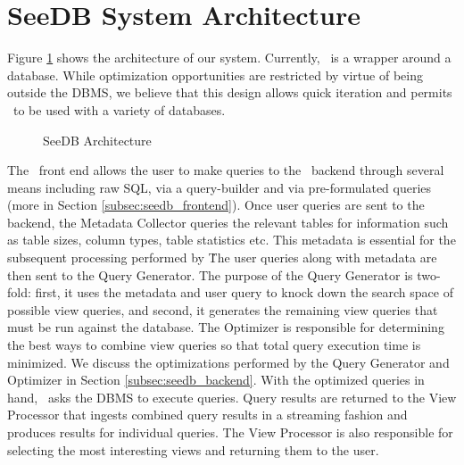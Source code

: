 \section{SeeDB System Architecture}
\label{sec:architecture}

Figure \ref{fig:sys-arch} shows the architecture of our system. Currently,
\SeeDB\ is a wrapper around a database. While optimization opportunities are
restricted by virtue of being outside the DBMS, we believe that this design
allows quick iteration and permits \SeeDB\ to be used with a variety of
databases.

\begin{figure}[htb]
\centerline{
\hbox{}}
\caption{SeeDB Architecture}
\label{fig:sys-arch}
\end{figure} 

The \SeeDB\ front end allows the user to make queries to the \SeeDB\ backend
through several means including raw SQL, via a query-builder and via
pre-formulated queries (more in Section \ref{subsec:seedb_frontend}). Once user
queries are sent to the backend, the Metadata Collector queries the relevant
tables for information such as table sizes, column types, table statistics etc.
This metadata is essential for the subsequent processing performed by \SeeDB\.
The user queries along with metadata are then sent to the Query Generator.
The purpose of the Query Generator is two-fold: first, it uses the metadata and
user query to knock down the search space of possible view queries, and second,
it generates the remaining view queries that must be run against the database.
The Optimizer is responsible for determining the best ways to combine view
queries so that total query execution time is minimized. We discuss the
optimizations performed by the Query Generator and Optimizer in Section
\ref{subsec:seedb_backend}. With the optimized queries in hand, \SeeDB\ asks the
DBMS to execute queries. Query results are returned to the View
Processor that ingests combined query results in a streaming fashion and produces results for
individual queries. The View Processor is also responsible for selecting the
most interesting views and returning them to the user.